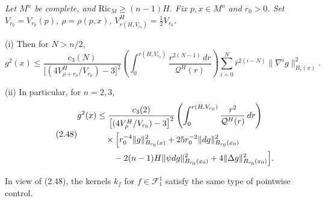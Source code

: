 \begin{theorem}
\label{thm:ricci-lower-bound-pointwise-estimate}

\textit{Let $M^n$ be complete, and $\mathrm{Ric}_M\ge (n-1)H$. Fix $p, x\in M^n$}
\textit{and $r_0>0$. Set $V_{r_0}=V_{r_0}(p)$, $\rho=\rho(p,x)$, $V^H_{r(H,V_{r_0})}=\frac12 V_{r_0}$.}

\noindent (i) Then for $N>n/2$,
\begin{equation}\tag{2.47}
g^2(x)\le \frac{c_3(N)}{\bigl[(4V^H_{\rho+r_0}/V_{r_0})-3\bigr]^2}
\left(\int_0^{r(H,V_{r_0})}\frac{r^{2(N-1)}\,dr}{\mathcal{Q}^H(r)}\right)
\sum_{i=0}^N \bar r^{2(i-N)}\|\nabla^i g\|^2_{B_r(x)}.
\end{equation}

\noindent (ii) In particular, for $n=2,3$,
\begin{equation}\tag{2.48}
\begin{aligned}
g^2(x)&\le \frac{c_3(2)}{\bigl[(4V^H_{\rho}/V_{r_0})-3\bigr]^2}
\left(\int_0^{r(H,V_{r_0})}\frac{r^2}{\mathcal{Q}^H(r)}\,dr\right) \\
&\quad\times\Bigl[r_0^{-4}\|g\|^2_{B_{r_0}(x)}
+25r_0^{-2}\|dg\|^2_{B_{r_0}(x_0)} \\
&\qquad -2(n-1)H\|\psi dg\|^2_{B_{r_0}(x_0)}
+4\|\Delta g\|^2_{B_{r_0}(x_0)}\Bigr].
\end{aligned}
\end{equation}
\end{theorem}

In view of (2.48), the kernels $k_f$ for $f\in \mathscr{F}_1^1$ satisfy the same
type of pointwise control.
